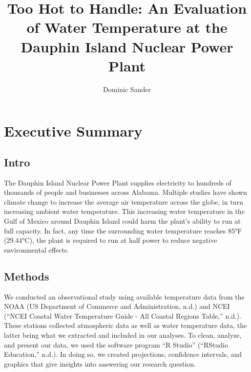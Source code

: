 \documentclass[
  letterpaper,
  DIV=11,
  numbers=noendperiod]{scrreprt}
\title{Too Hot to Handle: An Evaluation of Water Temperature at the
Dauphin Island Nuclear Power Plant}
\author{Dominic Sander}
\date{}
\renewcommand*\contentsname{Table of contents}
\newcommand\contentsname{Table of contents}
\begin{document}
\maketitle

\renewcommand*\contentsname{Table of contents}
{
\hypersetup{linkcolor=}
\setcounter{tocdepth}{2}
\tableofcontents
}


\chapter*{Executive Summary}\label{executive-summary}


\section*{Intro}\label{intro}


The Dauphin Island Nuclear Power Plant supplies electricity to hundreds
of thousands of people and businesses across Alabama. Multiple studies
have shown climate change to increase the average air temperature across
the globe, in turn increasing ambient water temperature. This increasing
water temperature in the Gulf of Mexico around Dauphin Island could harm
the plant's ability to run at full capacity. In fact, any time the
surrounding water temperature reaches 85°F (29.44°C), the plant is
required to run at half power to reduce negative environmental effects.

\section*{Methods}\label{methods}


We conducted an observational study using available temperature data
from the NOAA (US Department of Commerce and Administration, n.d.) and
NCEI ({``NCEI Coastal Water Temperature Guide - All Coastal Regions
Table,''} n.d.). These stations collected atmospheric data as well as
water temperature data, the latter being what we extracted and included
in our analyses. To clean, analyze, and present our data, we used the
software program ``R Studio'' ({``RStudio Education,''} n.d.). In doing
so, we created projections, confidence intervals, and graphics that give
insights into answering our research question.
\end{document}
